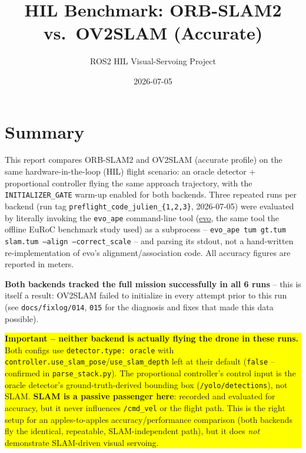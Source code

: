 \documentclass[11pt]{article}
\title{HIL Benchmark: ORB-SLAM2 vs.\ OV2SLAM (Accurate)}
\author{ROS2 HIL Visual-Servoing Project}
\date{2026-07-05}
\begin{document}
\maketitle

\section{Summary}

This report compares ORB-SLAM2 and OV2SLAM (accurate profile) on the same
hardware-in-the-loop (HIL) flight scenario: an oracle detector + proportional
controller flying the same approach trajectory, with the \texttt{INITIALIZER\_GATE}
warm-up enabled for both backends. Three repeated runs per backend (run tag
\texttt{preflight\_code\_julien\_\{1,2,3\}}, 2026-07-05) were evaluated by
literally invoking the \texttt{evo\_ape} command-line tool
(\href{https://github.com/MichaelGrupp/evo}{evo}, the same tool the offline
EuRoC benchmark study used) as a subprocess -- \texttt{evo\_ape tum gt.tum
slam.tum --align --correct\_scale} -- and parsing its stdout, not a hand-written
re-implementation of evo's alignment/association code. All accuracy figures are
reported in meters.

\textbf{Both backends tracked the full mission successfully in all 6 runs} --
this is itself a result: OV2SLAM failed to initialize in every attempt prior to
this run (see \texttt{docs/fixlog/014}, \texttt{015} for the diagnosis and fixes
that made this data possible).

\begin{center}
\colorbox{yellow}{%
  \begin{minipage}{0.92\textwidth}
  \textbf{Important -- neither backend is actually flying the drone in these
  runs.} Both configs use \texttt{detector.type: oracle} with
  \texttt{controller.use\_slam\_pose}/\texttt{use\_slam\_depth} left at their
  default (\texttt{false} -- confirmed in \texttt{parse\_stack.py}). The
  proportional controller's control input is the oracle detector's
  ground-truth-derived bounding box (\texttt{/yolo/detections}), not SLAM.
  \textbf{SLAM is a passive passenger here}: recorded and evaluated for
  accuracy, but it never influences \texttt{/cmd\_vel} or the flight path.
  This is the right setup for an apples-to-apples accuracy/performance
  comparison (both backends fly the identical, repeatable, SLAM-independent
  path), but it does \emph{not} demonstrate SLAM-driven visual servoing.
  \end{minipage}%
}
\end{center}
\end{document}
